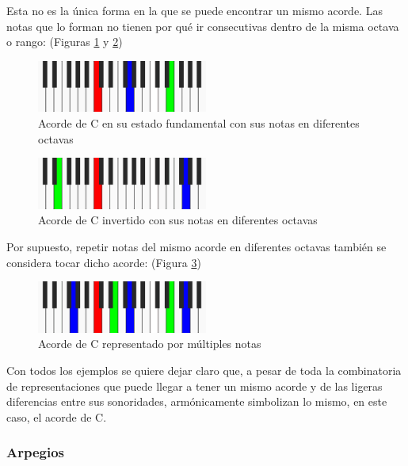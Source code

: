 Esta no es la única forma en la que se puede encontrar un mismo acorde. Las notas que lo forman no tienen por qué ir consecutivas dentro de la misma octava o rango: (Figuras \ref{fig:inversion_extra1} y \ref{fig:inversion_extra2})

\begin{figure}[H]
    \centering
    \includegraphics[width = 0.5\textwidth]{Imagenes/Bitmap/inversion_extra.png}
    \caption{Acorde de C en su estado fundamental con sus notas en diferentes octavas}
    \label{fig:inversion_extra1}
\end{figure}

\begin{figure}[H]
    \centering
    \includegraphics[width = 0.5\textwidth]{Imagenes/Bitmap/inversion_extra2.png}
    \caption{Acorde de C invertido con sus notas en diferentes octavas}
    \label{fig:inversion_extra2}
\end{figure}

Por supuesto, repetir notas del mismo acorde en diferentes octavas también se considera tocar dicho acorde: (Figura \ref{fig:inversion_extra3})

\begin{figure}[h]
    \centering
    \includegraphics[width = 0.5\textwidth]{Imagenes/Bitmap/inversion_extra3.png}
    \caption{Acorde de C representado por múltiples notas}
    \label{fig:inversion_extra3}
\end{figure}

Con todos los ejemplos se quiere dejar claro que, a pesar de toda la combinatoria de representaciones que puede llegar a tener un mismo acorde y de las ligeras diferencias entre sus sonoridades, armónicamente simbolizan lo mismo, en este caso, el acorde de C.

\subsubsection{Arpegios}\label{subsec:arpegios}

